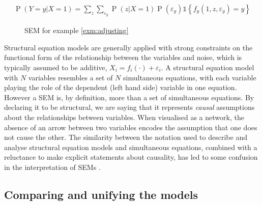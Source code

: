 \documentclass[11pt,a4paper,twoside]{report}
\newcommand{\set}[1]{\left\{#1\right\}}
\newcommand{\ind}[1]{\mathds{1}\!\!\set{#1}}
\newcommand{\eqn}[1]{\begin{align}#1\end{align}}
\renewcommand{\P}[1]{\operatorname{P}\left(#1\right)}
\theoremstyle{plain}
\theoremstyle{definition}
\let\epsilon\varepsilon
\begin{document}
\eqn{
\P{Y=y|X=1} = \sum_{z}\sum_{\epsilon_y}\P{z|X=1}\P{\epsilon_y}\ind{f_y(1,z,\epsilon_y)=y}
}


\begin{figure}[ht]
\centering
{}
\caption{SEM for example \ref{exm:adjusting}}
\label{fig:sem:preschool}
\end{figure}

Structural equation models are generally applied with strong constraints on the functional form of the relationship between the variables and noise, which is typically assumed to be additive, $X_i = f_i(\cdot)+\epsilon_i$. A structural equation model with $N$ variables resembles a set of $N$ simultaneous equations, with each variable playing the role of the dependent (left hand side) variable in one equation. However a SEM is, by definition, more than a set of simultaneous equations. By declaring it to be structural, we are saying that it represents \emph{causal} assumptions about the relationships between variables. When visualised as a network, the absence of an arrow between two variables encodes the assumption that one does not cause the other. The similarity between the notation used to describe and analyse structural equation models and simultaneous equations, combined with a reluctance to make explicit statements about causality, has led to some confusion in the interpretation of SEMs \citep{heckman2015causal,Pearl2000}. 

\subsection{Comparing and unifying the models}
\label{sec:unifying_causal_models}
\end{document}

